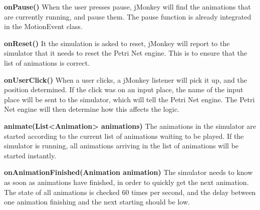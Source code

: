 \textbf{onPause()}
When the user presses pause, jMonkey will find the animations that are currently running, and pause them. The pause function is already integrated in the MotionEvent class.

\textbf{onReset()}
It the simulation is asked to reset, jMonkey will report to the simulator that it needs to reset the Petri Net engine. This is to ensure that the list of animations is correct.

\textbf{onUserClick()}
When a user clicks, a jMonkey listener will pick it up, and the position determined. If the click was on an input place, the name of the input place will be sent to the simulator, which will tell the Petri Net engine. The Petri Net engine will then determine how this affects the logic.

\textbf{animate(List<Animation> animations)}
The animations in the simulator are started according to the current list of animations waiting to be played. If the simulator is running, all animations arriving in the list of animations will be started instantly.

\textbf{onAnimationFinished(Animation animation)}
The simulator needs to know as soon as animations have finished, in order to quickly get the next animation. The state of all animations is checked 60 times per second, and the delay between one animation finishing and the next starting should be low.
